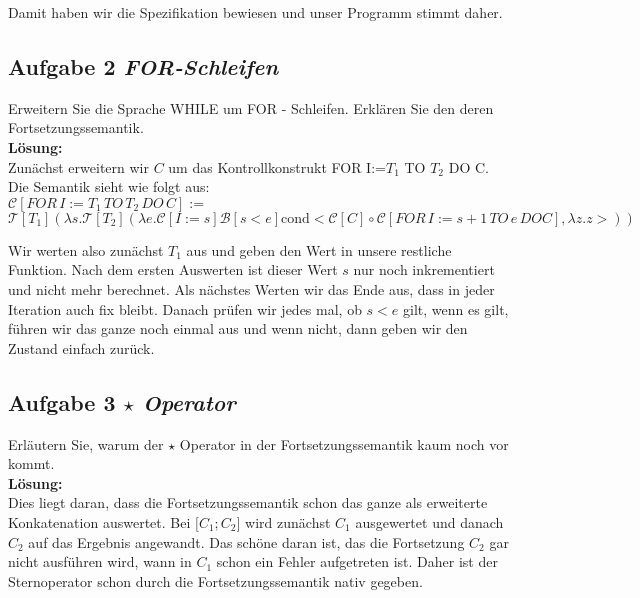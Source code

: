 \documentclass[11pt,a4paper,ngerman]{article}
\begin{document}
   Damit haben wir die Spezifikation bewiesen und unser Programm stimmt daher.

\subsection*{Aufgabe 2 \mdseries\itshape FOR-Schleifen}
   Erweitern Sie die Sprache WHILE um FOR - Schleifen.
   Erklären Sie den deren Fortsetzungssemantik.\\

\textbf{Lösung:}\\
   Zunächst erweitern wir $C$ um das Kontrollkonstrukt FOR I:=$T_1$ TO $T_2$ DO C.\\

   Die Semantik sieht wie folgt aus:\\
   $\mathcal{C}[FOR \, I:=T_1 \, TO \, T_2 \, DO \, C] :=$\\ 
   $\mathcal{T}[T_1] (\lambda s.\mathcal{T}[T_2](\lambda e. \mathcal{C}[I:=s] \mathcal{B}[s<e] \text{cond}
      <\mathcal{C}[C]\circ \mathcal{C}[FOR \, I := s + 1 \, TO \, e \, DO C], \lambda z.z>))$

   Wir werten also zunächst $T_1$ aus und geben den Wert in unsere restliche Funktion. Nach dem
   ersten Auswerten ist dieser Wert $s$ nur noch inkrementiert und nicht mehr berechnet. 
   Als nächstes Werten wir das Ende aus, dass in jeder Iteration auch fix bleibt. 
   Danach prüfen wir jedes mal, ob $s<e$ gilt, wenn es gilt, führen wir das ganze noch einmal aus
   und wenn nicht, dann geben wir den Zustand einfach zurück.

\pagebreak

\subsection*{Aufgabe 3 \mdseries\itshape $\star$ Operator}
   Erläutern Sie, warum der $\star$ Operator in der Fortsetzungssemantik kaum
   noch vor kommt.\\

\textbf{Lösung:}\\
   Dies liegt daran, dass die Fortsetzungssemantik schon das ganze als erweiterte
   Konkatenation auswertet. Bei $\mathcal[C_1;C_2]$ wird zunächst $C_1$ ausgewertet
   und danach $C_2$ auf das Ergebnis angewandt. Das schöne daran ist,
   das die Fortsetzung $C_2$ gar nicht ausführen wird, wann in $C_1$ schon ein
   Fehler aufgetreten ist. Daher ist der Sternoperator schon durch die
   Fortsetzungssemantik nativ gegeben.
\end{document}
